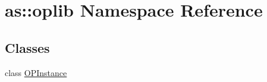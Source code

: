 \hypertarget{namespaceas_1_1oplib}{}\section{as\+:\+:oplib Namespace Reference}
\label{namespaceas_1_1oplib}
\subsection*{Classes}
\begin{DoxyCompactItemize}
\item 
class \hyperlink{classas_1_1oplib_1_1OPInstance}{O\+P\+Instance}
\end{DoxyCompactItemize}
